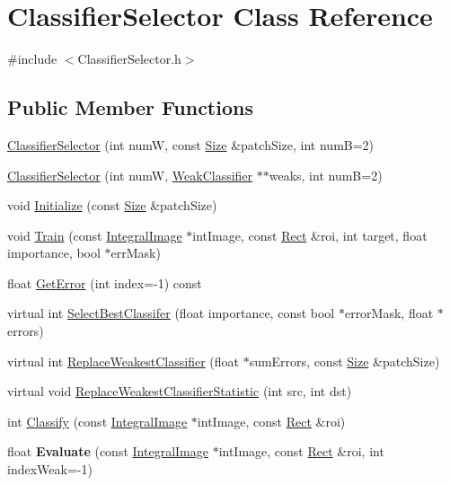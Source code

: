 \hypertarget{classClassifierSelector}{}\section{Classifier\+Selector Class Reference}
\label{classClassifierSelector}


{\ttfamily \#include $<$Classifier\+Selector.\+h$>$}

\subsection*{Public Member Functions}
\begin{DoxyCompactItemize}
\item 
\hyperlink{classClassifierSelector_a21eb14f2ad33c62dd94fdfced0d8d9e6}{Classifier\+Selector} (int num\+W, const \hyperlink{classSize}{Size} \&patch\+Size, int num\+B=2)
\item 
\hyperlink{classClassifierSelector_a6bf8094c2c8afde715ab75e729efa4af}{Classifier\+Selector} (int num\+W, \hyperlink{classWeakClassifier}{Weak\+Classifier} $\ast$$\ast$weaks, int num\+B=2)
\item 
void \hyperlink{classClassifierSelector_a2b2ae235c4577ea96e27f3a21480455f}{Initialize} (const \hyperlink{classSize}{Size} \&patch\+Size)
\item 
void \hyperlink{classClassifierSelector_afd948f69609ddac9d1effb6b899c4d08}{Train} (const \hyperlink{classIntegralImage}{Integral\+Image} $\ast$int\+Image, const \hyperlink{classRect}{Rect} \&roi, int target, float importance, bool $\ast$err\+Mask)
\item 
float \hyperlink{classClassifierSelector_ac7f854deb91854b56f24660b77e702ed}{Get\+Error} (int index=-\/1) const 
\item 
virtual int \hyperlink{classClassifierSelector_aa146f727c4d0d212935885bec3c63ed8}{Select\+Best\+Classifer} (float importance, const bool $\ast$error\+Mask, float $\ast$errors)
\item 
virtual int \hyperlink{classClassifierSelector_a027e9055c2ed7b27493e208d2ddd5cc9}{Replace\+Weakest\+Classifier} (float $\ast$sum\+Errors, const \hyperlink{classSize}{Size} \&patch\+Size)
\item 
virtual void \hyperlink{classClassifierSelector_a07a0717148abf071a4bc3785b72bb3d3}{Replace\+Weakest\+Classifier\+Statistic} (int src, int dst)
\item 
int \hyperlink{classClassifierSelector_acaca168ce5bb47624157c7559cc56108}{Classify} (const \hyperlink{classIntegralImage}{Integral\+Image} $\ast$int\+Image, const \hyperlink{classRect}{Rect} \&roi)
\item 
\hypertarget{classClassifierSelector_a580884e2c9069f9377c1ff49373c22ff}{}float {\bfseries Evaluate} (const \hyperlink{classIntegralImage}{Integral\+Image} $\ast$int\+Image, const \hyperlink{classRect}{Rect} \&roi, int index\+Weak=-\/1)\label{classClassifierSelector_a580884e2c9069f9377c1ff49373c22ff}


\end{DoxyCompactItemize}
